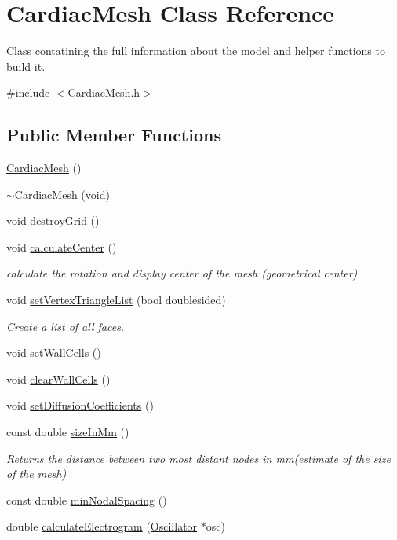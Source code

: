 \hypertarget{class_cardiac_mesh}{\section{Cardiac\+Mesh Class Reference}
\label{class_cardiac_mesh}
}


Class contatining the full information about the model and helper functions to build it.  




{\ttfamily \#include $<$Cardiac\+Mesh.\+h$>$}

\subsection*{Public Member Functions}
\begin{DoxyCompactItemize}
\item 
\hyperlink{class_cardiac_mesh_a864c30e0e6cdab5e1a1e39ab99a45e5b}{Cardiac\+Mesh} ()
\item 
\hyperlink{class_cardiac_mesh_a91b0200d15669cbdef50c3d8a6ad523f}{$\sim$\+Cardiac\+Mesh} (void)
\item 
void \hyperlink{class_cardiac_mesh_ac4e6a0774e1b1abf2ddbf2cc59434a92}{destroy\+Grid} ()
\item 
void \hyperlink{class_cardiac_mesh_a92f03d96fb065ce0d12b3865182ec1b7}{calculate\+Center} ()
\begin{DoxyCompactList}\small\item\em calculate the rotation and display center of the mesh (geometrical center) \end{DoxyCompactList}\item 
void \hyperlink{class_cardiac_mesh_ae6002bc62e88a0a4b21ba222adc04e25}{set\+Vertex\+Triangle\+List} (bool doublesided)
\begin{DoxyCompactList}\small\item\em Create a list of all faces. \end{DoxyCompactList}\item 
void \hyperlink{class_cardiac_mesh_ae84e8d8f86a437e47ea99d1bf212e2ce}{set\+Wall\+Cells} ()
\item 
void \hyperlink{class_cardiac_mesh_a45cb6c32debebdc827e2c4f48e8f5ce2}{clear\+Wall\+Cells} ()
\item 
void \hyperlink{class_cardiac_mesh_a5fb6507c440aeb2d947663047fbdac92}{set\+Diffusion\+Coefficients} ()
\item 
const double \hyperlink{class_cardiac_mesh_a42566f30cadab259f5905bb118220f6a}{size\+In\+Mm} ()
\begin{DoxyCompactList}\small\item\em Returns the distance between two most distant nodes in mm(estimate of the size of the mesh) \end{DoxyCompactList}\item 
const double \hyperlink{class_cardiac_mesh_a219a641ed3e91234a3fb76f51cec326f}{min\+Nodal\+Spacing} ()
\item 
double \hyperlink{class_cardiac_mesh_abf74825fdb7bc14445c25877f06e36af}{calculate\+Electrogram} (\hyperlink{class_oscillator}{Oscillator} $\ast$osc)
\end{DoxyCompactItemize}
